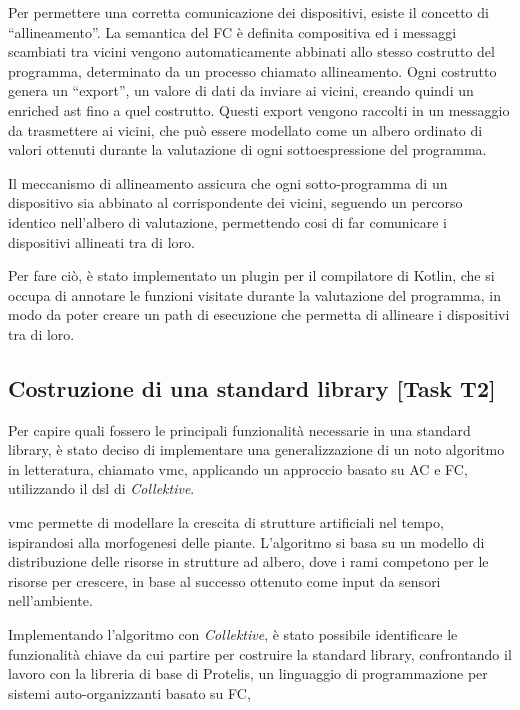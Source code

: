 \documentclass[13pt, a4paper]{article}
\newcommand{\ck}{\emph{Collektive}}
\begin{document}
Per permettere una corretta comunicazione dei dispositivi, esiste il concetto di ``allineamento''.
%
La semantica del \ac{FC} è definita compositiva ed i messaggi scambiati tra vicini vengono automaticamente abbinati
    allo stesso costrutto del programma, determinato da un processo chiamato allineamento.
%
Ogni costrutto genera un ``export'', un valore di dati da inviare ai vicini, creando quindi un enriched \ac{ast} fino a quel costrutto.
%
Questi export vengono raccolti in un messaggio da trasmettere ai vicini, che può essere modellato come
    un albero ordinato di valori ottenuti durante la valutazione di ogni sottoespressione del programma.

Il meccanismo di allineamento assicura che ogni sotto-programma di un dispositivo sia abbinato al corrispondente dei vicini,
    seguendo un percorso identico nell'albero di valutazione,
    permettendo cosi di far comunicare i dispositivi allineati tra di loro.

Per fare ciò, è stato implementato un plugin per il compilatore di Kotlin, che si occupa di annotare le funzioni visitate
    durante la valutazione del programma, in modo da poter creare un path di esecuzione che permetta di allineare i dispositivi
    tra di loro.

\subsection{Costruzione di una standard library [Task T2]}\label{subsec:task-t2-[costruzione-di-una-standard-library]}

Per capire quali fossero le principali funzionalità necessarie in una standard library,
è stato deciso di implementare una generalizzazione di un noto algoritmo in letteratura, chiamato \ac{vmc},
applicando un approccio basato su \ac{AC} e \ac{FC}, utilizzando il \ac{dsl} di \ck{}.

\ac{vmc} permette di modellare la crescita di strutture artificiali nel tempo, ispirandosi alla morfogenesi delle piante.
%
L'algoritmo si basa su un modello di distribuzione delle risorse in strutture ad albero,
    dove i rami competono per le risorse per crescere, in base al successo ottenuto come input da sensori nell'ambiente.

Implementando l'algoritmo con \ck{}, è stato possibile identificare le funzionalità chiave da cui partire per costruire la standard library,
    confrontando il lavoro con la libreria di base di Protelis,
    un linguaggio di programmazione per sistemi auto-organizzanti basato su \ac{FC},
\end{document}
